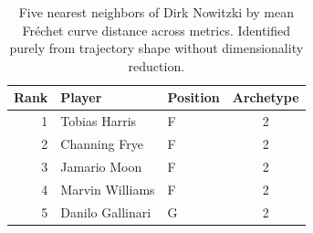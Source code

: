 \begin{table}[htbp]
  \centering\small
  \begin{tabular}{rllc}
    \toprule
    Rank & Player & Position & Archetype \\
    \midrule
    1 & Tobias Harris & F & 2 \\
    2 & Channing Frye & F & 2 \\
    3 & Jamario Moon & F & 2 \\
    4 & Marvin Williams & F & 2 \\
    5 & Danilo Gallinari & G & 2 \\
    \bottomrule
  \end{tabular}
  \caption{Five nearest neighbors of Dirk Nowitzki by mean Fr\'{e}chet curve distance across metrics. Identified purely from trajectory shape without dimensionality reduction.}
  \label{tab:Dirk_Nowitzki_frechet_curve_neighbors}
\end{table}

